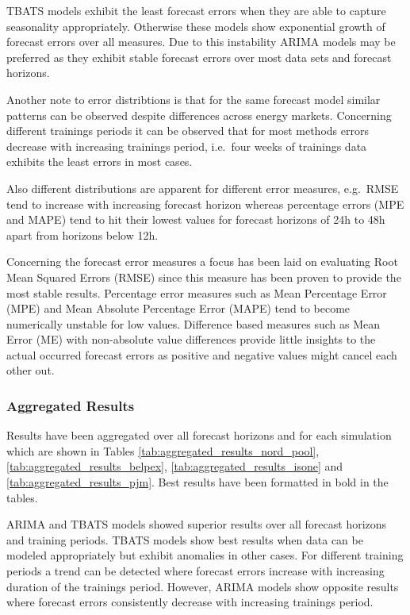 TBATS models exhibit the least forecast errors when they are able to capture seasonality appropriately. Otherwise these models show exponential growth of forecast errors over all measures. Due to this instability ARIMA models may be preferred as they exhibit stable forecast errors over most data sets and forecast horizons. 

Another note to error distribtions is that for the same forecast model similar patterns can be observed despite differences across energy markets. Concerning different trainings periods it can be observed that for most methods errors decrease with increasing trainings period, i.e.~four weeks of trainings data exhibits the least errors in most cases. 

Also different distributions are apparent for different error measures, e.g.~RMSE tend to increase with increasing forecast horizon whereas percentage errors (MPE and MAPE) tend to hit their lowest values for forecast horizons of 24h to 48h apart from horizons below 12h. 

Concerning the forecast error measures a focus has been laid on evaluating Root Mean Squared Errors (RMSE) since this measure has been proven to provide the most stable results. Percentage error measures such as Mean Percentage Error (MPE) and Mean Absolute Percentage Error (MAPE) tend to become numerically unstable for low values. Difference based measures such as Mean Error (ME) with non-absolute value differences provide little insights to the actual occurred forecast errors as positive and negative values might cancel each other out. 



\subsubsection{Aggregated Results}

Results have been aggregated over all forecast horizons and for each simulation which are shown in Tables \ref{tab:aggregated_results_nord_pool}, \ref{tab:aggregated_results_belpex}, \ref{tab:aggregated_results_isone} and \ref{tab:aggregated_results_pjm}. Best results have been formatted in bold in the tables. 

ARIMA and TBATS models showed superior results over all forecast horizons and training periods. TBATS models show best results when data can be modeled appropriately but exhibit anomalies in other cases. For different training periods a trend can be detected where forecast errors increase with increasing duration of the trainings period. However, ARIMA models show opposite results where forecast errors consistently decrease with increasing trainings period. 


